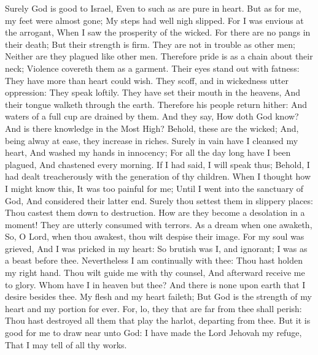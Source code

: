 Surely God is good to Israel, Even to such as are pure in heart.  But as for me, my feet were almost gone; My steps had well nigh slipped.  For I was envious at the arrogant, When I saw the prosperity of the wicked.  For there are no pangs in their death; But their strength is firm.  They are not in trouble as other men; Neither are they plagued like other men.  Therefore pride is as a chain about their neck; Violence covereth them as a garment.  Their eyes stand out with fatness: They have more than heart could wish.  They scoff, and in wickedness utter oppression: They speak loftily.  They have set their mouth in the heavens, And their tongue walketh through the earth.  Therefore his people return hither: And waters of a full cup are drained by them.  And they say, How doth God know? And is there knowledge in the Most High?  Behold, these are the wicked; And, being alway at ease, they increase in riches.  Surely in vain have I cleansed my heart, And washed my hands in innocency;  For all the day long have I been plagued, And chastened every morning.  If I had said, I will speak thus; Behold, I had dealt treacherously with the generation of thy children.  When I thought how I might know this, It was too painful for me;  Until I went into the sanctuary of God, And considered their latter end.  Surely thou settest them in slippery places: Thou castest them down to destruction.  How are they become a desolation in a moment! They are utterly consumed with terrors.  As a dream when one awaketh, So, O Lord, when thou awakest, thou wilt despise their image.  For my soul was grieved, And I was pricked in my heart:  So brutish was I, and ignorant; I was as a beast before thee.  Nevertheless I am continually with thee: Thou hast holden my right hand.  Thou wilt guide me with thy counsel, And afterward receive me to glory.  Whom have I in heaven but thee? And there is none upon earth that I desire besides thee.  My flesh and my heart faileth; But God is the strength of my heart and my portion for ever.  For, lo, they that are far from thee shall perish: Thou hast destroyed all them that play the harlot, departing from thee.  But it is good for me to draw near unto God: I have made the Lord Jehovah my refuge, That I may tell of all thy works. 

